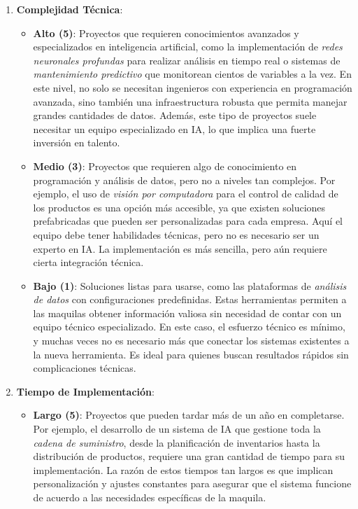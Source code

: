 \begin{enumerate}
    \item \textbf{Complejidad Técnica}:
    \begin{itemize}
        \item \textbf{Alto (5)}: Proyectos que requieren conocimientos avanzados y especializados en inteligencia artificial, como la implementación de \textit{redes neuronales profundas} para realizar análisis en tiempo real o sistemas de \textit{mantenimiento predictivo} que monitorean cientos de variables a la vez. En este nivel, no solo se necesitan ingenieros con experiencia en programación avanzada, sino también una infraestructura robusta que permita manejar grandes cantidades de datos. Además, este tipo de proyectos suele necesitar un equipo especializado en IA, lo que implica una fuerte inversión en talento.
        
        \item \textbf{Medio (3)}: Proyectos que requieren algo de conocimiento en programación y análisis de datos, pero no a niveles tan complejos. Por ejemplo, el uso de \textit{visión por computadora} para el control de calidad de los productos es una opción más accesible, ya que existen soluciones prefabricadas que pueden ser personalizadas para cada empresa. Aquí el equipo debe tener habilidades técnicas, pero no es necesario ser un experto en IA. La implementación es más sencilla, pero aún requiere cierta integración técnica.
        
        \item \textbf{Bajo (1)}: Soluciones listas para usarse, como las plataformas de \textit{análisis de datos} con configuraciones predefinidas. Estas herramientas permiten a las maquilas obtener información valiosa sin necesidad de contar con un equipo técnico especializado. En este caso, el esfuerzo técnico es mínimo, y muchas veces no es necesario más que conectar los sistemas existentes a la nueva herramienta. Es ideal para quienes buscan resultados rápidos sin complicaciones técnicas.
    \end{itemize}

    \item \textbf{Tiempo de Implementación}:
    \begin{itemize}
        \item \textbf{Largo (5)}: Proyectos que pueden tardar más de un año en completarse. Por ejemplo, el desarrollo de un sistema de IA que gestione toda la \textit{cadena de suministro}, desde la planificación de inventarios hasta la distribución de productos, requiere una gran cantidad de tiempo para su implementación. La razón de estos tiempos tan largos es que implican personalización y ajustes constantes para asegurar que el sistema funcione de acuerdo a las necesidades específicas de la maquila.
        

\end{itemize}
\end{enumerate}
